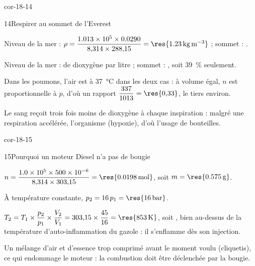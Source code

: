 \begin{blocLivre}{cor-18-14}
\begin{corrige}{14}{Respirer au sommet de l'Everest}
\begin{questions}
\item Niveau de la mer : $\rho=\dfrac{\num{1.013e5}\times\num{0.0290}}{8{,}314\times288{,}15}=\res{\qty{1,23}{kg.m^{-3}}}$ ; sommet :
.
\item Niveau de la mer :  de dioxygène par litre ; sommet : , soit 39~\% seulement.
\item Dans les poumons, l'air est à \qty{37}{\degreeCelsius} dans les deux cas : à volume égal, $n$ est proportionnelle à $p$,
d'où un rapport $\dfrac{337}{1013}=\res{0{,}33}$, le tiers environ.
\item Le sang reçoit trois fois moins de dioxygène à chaque inspiration : malgré une respiration accélérée, l'organisme
 (hypoxie), d'où l'usage de bouteilles.
\end{questions}
\end{corrige}
\end{blocLivre}
\begin{blocLivre}{cor-18-15}
\begin{corrige}{15}{Pourquoi un moteur Diesel n'a pas de bougie}
\begin{questions}
\item $n=\dfrac{\num{1.0e5}\times\num{500e-6}}{8{,}314\times303{,}15}=\res{\qty{0,0198}{mol}}$, soit $m=\res{\qty{0,575}{g}}$.
\item À température constante, $p_2=16\,p_1=\res{\qty{16}{bar}}$.
\item $T_2=T_1\times\dfrac{p_2}{p_1}\times\dfrac{V_2}{V_1}=303{,}15\times\dfrac{45}{16}=\res{\qty{853}{K}}$, soit ,
bien au-dessus de la température d'auto-inflammation du gazole : il s'enflamme dès son injection.
\item Un mélange d'air et d'essence trop comprimé  avant le moment voulu (cliquetis),
ce qui endommage le moteur : la combustion doit être déclenchée par la bougie.
\end{questions}
\end{corrige}
\end{blocLivre}
